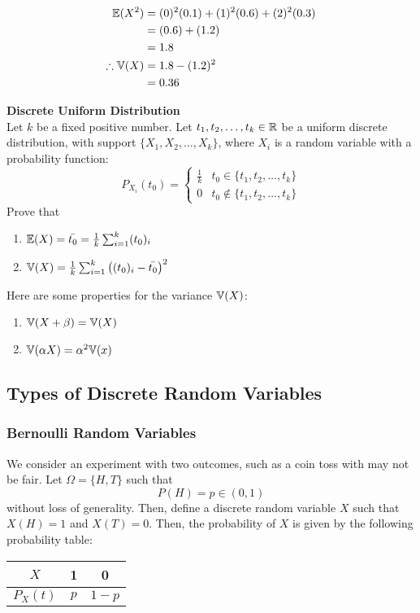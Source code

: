 \documentclass{article}
\begin{document}
	\begin{exmp}
		\begin{align*}
			\mathbb{E}(X^2) &= (0)^2 (0.1) + (1)^2 (0.6)  + (2)^2 (0.3) \\
			&= (0.6) + (1.2) \\
			&= 1.8\\
			\therefore \mathbb{V}(X) &= 1.8 - (1.2)^2 \\
			&= 0.36
		\end{align*}
	\end{exmp}
\pagebreak
	\begin{exe}
		\textbf{Discrete Uniform Distribution} \\
		Let $k$ be a fixed positive number. Let $t_1, t_2, \dots, t_k \in \mathbb{R}$ be a uniform discrete distribution, with support $\{X_1, X_2,  \dots, X_k\}$, where $X_i$ is a random variable with a probability function:
		$$ P_{X_i} (t_0) = 
			\begin{cases}
			\frac{1}{k} & t_0 \in \{t_1, t_2, \dots, t_k \} \\
			0 & t_0 \notin \{t_1, t_2, \dots, t_k \}
			\end{cases}
		$$
		Prove that 
		\begin{enumerate}
			\item$ \mathbb{E}(X) = \bar{t_0} = \frac{1}{k} \sum_{i=1}^{k}({t_0})_i$ 
			\item $\mathbb{V}(X) = \frac{1}{k} \sum_{i=1}^k \big( (t_0)_i - \bar{t_0} \big)^2$
		\end{enumerate}
	\end{exe}
	Here are some properties for the variance $\mathbb{V}(X)$:
	\begin{enumerate}
		\item $\mathbb{V} (X + \beta) = \mathbb{V} (X)$ 
		\item $\mathbb{V} (\alpha X)  = \alpha^2 \mathbb{V}(x)$
	\end{enumerate}
\subsection{Types of Discrete Random Variables}
	\subsubsection{Bernoulli Random Variables}
	We consider an experiment with two outcomes, such as a coin toss with may not be fair. Let $\Omega = \{H,T\}$  such that $$P(H) = p \in (0,1)$$ without loss of generality. Then, define a discrete random variable $X$ such that $X(H) = 1$ and $X(T) = 0$. Then, the probability of $X$ is given by the following probability table:
	\begin{table}[h]
		\begin{tabular}{c|c|c}
			$X$ & 1      & 0     \\ \hline
			$P_X(t)$ & $p$ & $1-p$
		\end{tabular}
	\end{table}
\end{document}
